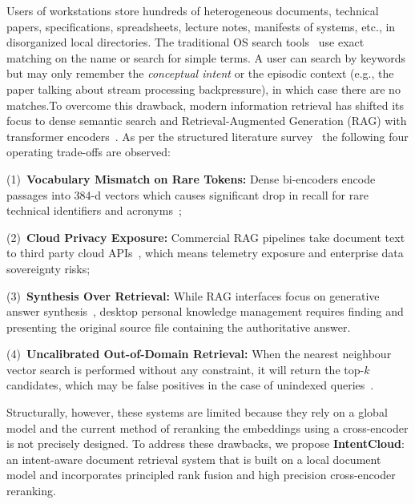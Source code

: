\documentclass[conference]{IEEEtran}
\makeatletter
\def\section{\@startsection{section}{1}{\z@}{0.75ex plus 0.15ex minus 0.1ex}{0.35ex plus 0.1ex}{\normalfont\normalsize\scshape\centering}}
\makeatother
\begin{document}
\section{Introduction}
Users of workstations store hundreds of heterogeneous documents, technical papers, specifications, spreadsheets, lecture notes, manifests of systems, etc., in disorganized local directories. The traditional OS search tools~\cite{karthikeyan2025smart} use exact matching on the name or search for simple terms. A user can search by keywords but may only remember the \textit{conceptual intent} or the episodic context (e.g., the paper talking about stream processing backpressure), in which case there are no matches.To overcome this drawback, modern information retrieval has shifted its focus to dense semantic search and Retrieval-Augmented Generation (RAG) with transformer encoders~\cite{vaswani2017attention, vnrk2025semantic}. As per the structured literature survey~\cite{karthikeyan2025smart, vaswani2017attention, vnrk2025semantic, brundha2022vector, douze2024faiss, krishnan2025semantic, jacob2024chatgpt, sawarkar2024blended, rafi2026rag, tiwari2026finetuning, saha2024quim, cejas2025retrieval, sriram2024local, kuchlous2020intent, puspitasari2026intent, nan2026dsmr, holubiev2024agents, nickolls2008cuda, apple2026mps} the following four operating trade-offs are observed:

(1)~\textbf{Vocabulary Mismatch on Rare Tokens:} Dense bi-encoders encode passages into 384-d vectors which causes significant drop in recall for rare technical identifiers and acronyms~\cite{brundha2022vector, vnrk2025semantic};

(2)~\textbf{Cloud Privacy Exposure:} Commercial RAG pipelines take document text to third party cloud APIs~\cite{krishnan2025semantic, jacob2024chatgpt, rafi2026rag}, which means telemetry exposure and enterprise data sovereignty risks;

(3)~\textbf{Synthesis Over Retrieval:} While RAG interfaces focus on generative answer synthesis~\cite{rafi2026rag, saha2024quim}, desktop personal knowledge management requires finding and presenting the original source file containing the authoritative answer.

(4)~\textbf{Uncalibrated Out-of-Domain Retrieval:} When the nearest neighbour vector search is performed without any constraint, it will return the top-$k$ candidates, which may be false positives in the case of unindexed queries~\cite{cejas2025retrieval}.

Structurally, however, these systems are limited because they rely on a global model and the current method of reranking the embeddings using a cross-encoder is not precisely designed. To address these drawbacks, we propose \textbf{IntentCloud}: an intent-aware document retrieval system that is built on a local document model and incorporates principled rank fusion and high precision cross-encoder reranking.
\end{document}
